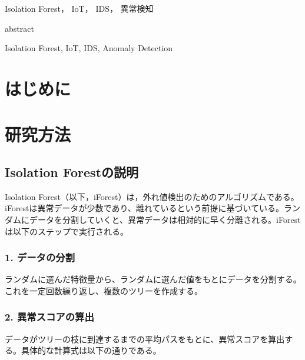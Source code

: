 \documentclass{css}
\begin{document}

\begin{jkeyword}
Isolation Forest， IoT， IDS， 異常検知
\end{jkeyword}

\begin{eabstract}
abstract

\end{eabstract}


\begin{ekeyword}
Isolation Forest, IoT, IDS, Anomaly Detection
\end{ekeyword}


\maketitle

\section{はじめに}

\section{研究方法}

\subsection{Isolation Forestの説明}
Isolation Forest（以下，iForest）は，外れ値検出のためのアルゴリズムである。iForestは異常データが少数であり、離れているという前提に基づいている。ランダムにデータを分割していくと、異常データは相対的に早く分離される。iForestは以下のステップで実行される。

\subsubsection*{1. データの分割}
ランダムに選んだ特徴量から、ランダムに選んだ値をもとにデータを分割する。これを一定回数繰り返し、複数のツリーを作成する。

\subsubsection*{2. 異常スコアの算出}
データがツリーの枝に到達するまでの平均パスをもとに、異常スコアを算出する。具体的な計算式は以下の通りである。
\end{document}
